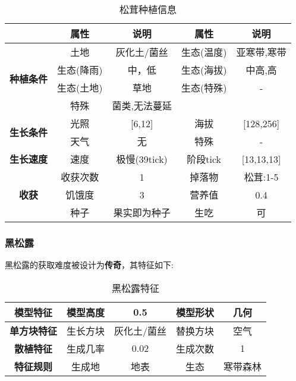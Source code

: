 \begin{table}[H]
    \centering
    \caption{松茸种植信息}
    \label{table:松茸种植信息}
    \setlength{\tabcolsep}{4mm}
    \begin{tabular}{c|cc|cc}
        \toprule
                                           & \textbf{属性} & \textbf{说明} & \textbf{属性} & \textbf{说明} \\
        \midrule
        \multirow{4}{*}{\textbf{种植条件}} & 土地          & 灰化土/菌丝    & 生态(温度)    & 亚寒带,寒带    \\
                                           & 生态(降雨)    & 中，低        & 生态(海拔)    & 中高,高            \\
                                           & 生态(土地)    & 草地          & 生态(特殊)    & -             \\
                                           & 特殊          & 菌类,无法蔓延           \\
        \midrule
        \multirow{2}{*}{\textbf{生长条件}} & 光照          & [6,12]        & 海拔          & [128,256]      \\
                                           & 天气          & 无            & 特殊          & -             \\
        \midrule
        \textbf{生长速度}                  & 速度          & 极慢(39tick)     & 阶段tick      & [13,13,13]       \\
        \midrule
        \multirow{3}{*}{\textbf{收获}}     & 收获次数      & 1             & 掉落物        & 松茸:1-5      \\
                                           & 饥饿度        & 3             & 营养值        & 0.4           \\
                                           & 种子          & 果实即为种子  & 生吃          & 可   \\
        \bottomrule
    \end{tabular}
\end{table}

\subsubsection{黑松露}

黑松露的获取难度被设计为\textbf{传奇}，其特征如下:
\begin{table}[H]
    \centering
    \caption{黑松露特征}
    \label{table:黑松露特征}
    \setlength{\tabcolsep}{4mm}
    \begin{tabular}{c|cc|cc}
        \toprule
        \textbf{模型特征}   & 模型高度 & 0.5      & 模型形状 & 几何     \\
        \midrule
        \textbf{单方块特征} & 生长方块 & 灰化土/菌丝 & 替换方块 & 空气     \\
        \midrule
        \textbf{散植特征}   & 生成几率 & 0.02   & 生成次数 & 1        \\
        \midrule
        \textbf{特征规则}   & 生成地   & 地表   & 生态     & 寒带森林 \\
        \bottomrule
    \end{tabular}
\end{table}


